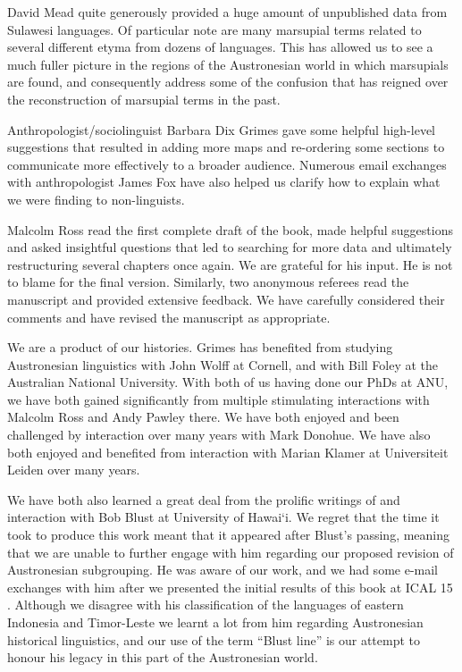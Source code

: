 David Mead quite generously provided a huge amount of unpublished data from Sulawesi languages.
Of particular note are many marsupial terms related to several different etyma from dozens of languages.
This has allowed us to see a much fuller picture in the regions of the Austronesian world in which marsupials are found,
and consequently address some of the confusion that has reigned over the reconstruction of marsupial terms in the past.

Anthropologist/sociolinguist Barbara Dix Grimes gave some helpful high-level suggestions
that resulted in adding more maps and re-ordering some sections to communicate more effectively to a broader audience.
Numerous email exchanges with anthropologist James Fox have also helped us clarify how to explain what we were finding to non-linguists.

Malcolm Ross read the first complete draft of the book,
made helpful suggestions and asked insightful questions that
led to searching for more data and ultimately restructuring several chapters once again.
We are grateful for his input.
He is not to blame for the final version.
Similarly, two anonymous referees read the manuscript and provided extensive feedback.
We have carefully considered their comments and have revised the manuscript as appropriate.

We are a product of our histories.
Grimes has benefited from studying Austronesian linguistics with John Wolff at Cornell,
and with Bill Foley at the Australian National University.
With both of us having done our PhDs at ANU,
we have both gained significantly from multiple stimulating interactions with Malcolm Ross and Andy Pawley there.
We have both enjoyed and been challenged by interaction over many years with Mark Donohue.
We have also both enjoyed and benefited from interaction with Marian Klamer at Universiteit Leiden over many years.

We have both also learned a great deal from the prolific writings of and interaction with Bob Blust at University of Hawai‘i.
We regret that the time it took to produce this work meant that it appeared after Blust’s passing,
meaning that we are unable to further engage with him regarding our proposed revision of Austronesian subgrouping.
He was aware of our work,
and we had some e-mail exchanges with him after we presented the initial results of this book at ICAL 15 \citep{EdwardsGrimes2021}.
Although we disagree with his classification of the languages of
eastern Indonesia and Timor-Leste we learnt a lot from him regarding Austronesian historical linguistics,
and our use of the term “Blust line” is our attempt to honour his legacy in this part of the Austronesian world.

